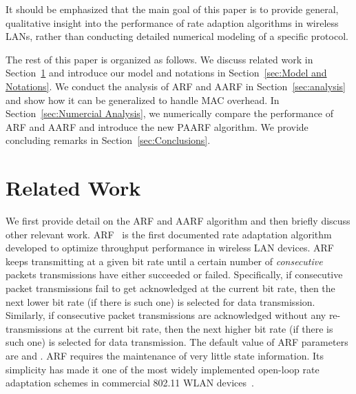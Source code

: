 \documentclass[11pt, journal, letterpaper, oneside, onecolumn]{IEEEtran}
\begin{document}
It should be emphasized that the main goal of this paper is to provide general, qualitative insight
into the performance of rate adaption algorithms in wireless LANs, rather than conducting
detailed numerical modeling of a specific  protocol.

The rest of this paper is organized as follows. We discuss related
work  in Section~\ref{sec:Related Work} and introduce our model
and notations in Section~\ref{sec:Model and Notations}. We conduct
the analysis of ARF and AARF in Section~\ref{sec:analysis} and show how it can be generalized to handle MAC overhead. In Section~\ref{sec:Numercial Analysis}, we numerically compare the
performance of ARF and AARF and introduce the new PAARF algorithm.
We provide concluding remarks in Section~\ref{sec:Conclusions}.




\section {Related Work}
\label{sec:Related Work}

We first provide detail on the ARF and AARF algorithm and then
briefly discuss other relevant work. ARF~\cite{OrgARF} is the first documented rate adaptation
algorithm developed to optimize throughput performance in wireless
LAN devices.
ARF keeps transmitting at a given bit rate until a certain number of
\emph{consecutive} packets transmissions have either succeeded or
failed. Specifically, if  consecutive packet transmissions fail
to get acknowledged at the current bit rate, then the next lower
bit rate (if there is such one) is selected for data transmission.
Similarly, if  consecutive packet transmissions are acknowledged
without any re-transmissions at the current bit rate, then the next
higher bit rate (if there is such one) is selected for data
transmission. The default value of ARF parameters are  and
. ARF requires the maintenance of very little state
information.
Its simplicity has made it one of the most widely implemented
open-loop rate adaptation schemes in commercial 802.11 WLAN
devices~\cite{CARA}.
\end{document}
